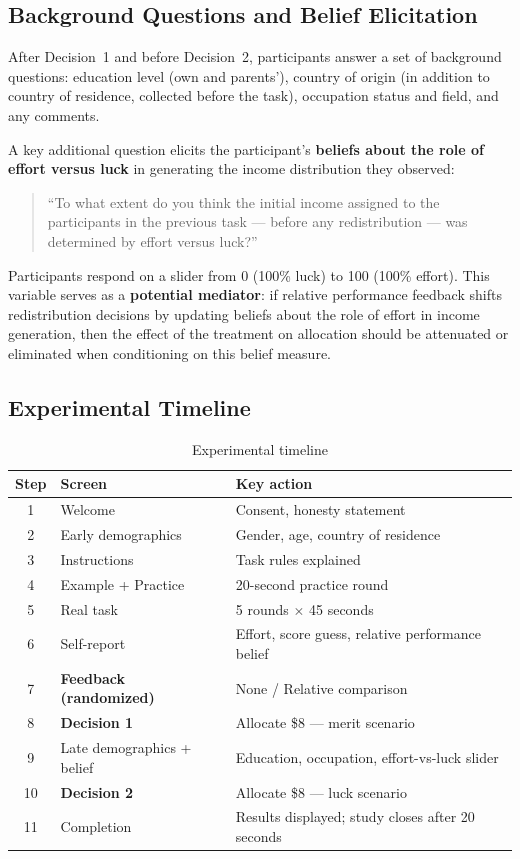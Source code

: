 \documentclass[12pt]{article}
\begin{document}
\subsection{Background Questions and Belief Elicitation}

After Decision~1 and before Decision~2, participants answer a set of background questions: education level (own and parents'), country of origin (in addition to country of residence, collected before the task), occupation status and field, and any comments.

A key additional question elicits the participant's \textbf{beliefs about the role of effort versus luck} in generating the income distribution they observed:

\begin{quote}
``To what extent do you think the initial income assigned to the participants in the previous task — before any redistribution — was determined by effort versus luck?''
\end{quote}

Participants respond on a slider from 0 (100\% luck) to 100 (100\% effort). This variable serves as a \textbf{potential mediator}: if relative performance feedback shifts redistribution decisions by updating beliefs about the role of effort in income generation, then the effect of the treatment on allocation should be attenuated or eliminated when conditioning on this belief measure.

\subsection{Experimental Timeline}

\begin{table}[h]
\centering
\caption{Experimental timeline}
\label{tab:timeline}
\begin{tabular}{cll}
\toprule
Step & Screen & Key action \\
\midrule
1  & Welcome                    & Consent, honesty statement \\
2  & Early demographics         & Gender, age, country of residence \\
3  & Instructions               & Task rules explained \\
4  & Example + Practice         & 20-second practice round \\
5  & Real task                  & 5 rounds $\times$ 45 seconds \\
6  & Self-report                & Effort, score guess, relative performance belief \\
7  & \textbf{Feedback (randomized)} & None / Relative comparison \\
8  & \textbf{Decision 1}        & Allocate \$8 — merit scenario \\
9  & Late demographics + belief & Education, occupation, effort-vs-luck slider \\
10 & \textbf{Decision 2}        & Allocate \$8 — luck scenario \\
11 & Completion                 & Results displayed; study closes after 20 seconds \\
\bottomrule
\end{tabular}
\end{table}
\end{document}
